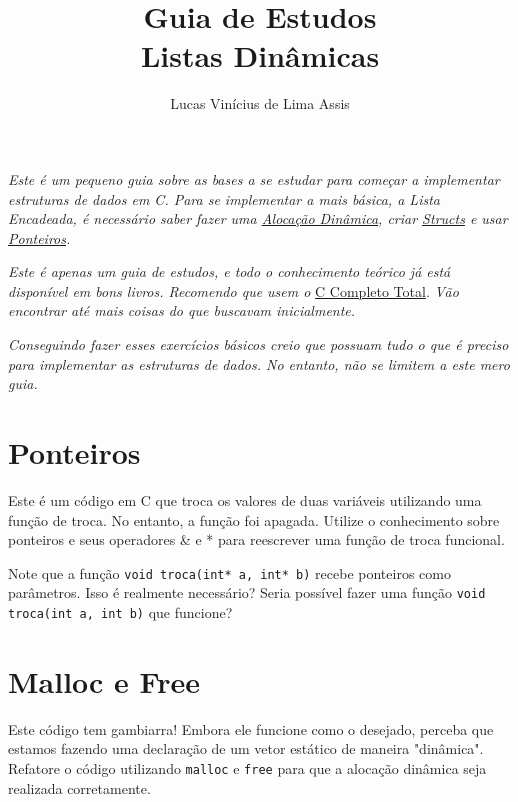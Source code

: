 \documentclass[a4paper]{article}
\author{Lucas Vinícius de Lima Assis}
\title{Guia de Estudos \\ Listas Dinâmicas}
\begin{document}
    \maketitle
    

    
    \textit{Este é um pequeno guia sobre as bases a se estudar para começar a
    implementar estruturas de dados em C. Para se implementar a mais básica, a
    Lista Encadeada, é necessário saber fazer uma \uline{Alocação Dinâmica}, criar
    \uline{Structs} e usar \uline{Ponteiros}.}

    \textit{Este é apenas um guia de estudos, e todo o conhecimento teórico já está
    disponível em bons livros. Recomendo que usem o}
    \href{https://www.inf.ufpr.br/lesoliveira/download/c-completo-total.pdf}{C
    Completo Total}. \textit{Vão encontrar até mais coisas do que buscavam
        inicialmente.}

    \textit{Conseguindo fazer esses exercícios básicos creio que possuam tudo o que é
    preciso para implementar as estruturas de dados. No entanto, não se limitem
    a este mero guia.}

    \section*{Ponteiros}

    Este é um código em C que troca os valores de duas variáveis utilizando uma
    função de troca. No entanto, a função foi apagada. Utilize o conhecimento
    sobre ponteiros e seus operadores \& e * para reescrever uma função de troca
    funcional. 

    \begin{tcolorbox}
        
    \end{tcolorbox}

    Note que a função \verb|void troca(int* a, int* b)| recebe ponteiros como
    parâmetros. Isso é realmente necessário? Seria possível fazer uma função
    \verb|void troca(int a, int b)| que funcione? 

    \section*{Malloc e Free}

    Este código tem gambiarra! Embora ele funcione como o desejado, perceba que
    estamos fazendo uma declaração de um vetor estático de maneira "dinâmica".
    Refatore o código utilizando \verb|malloc| e \verb|free| para que a alocação
    dinâmica seja realizada corretamente.
\end{document}
